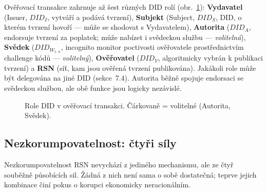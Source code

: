 \documentclass[11pt,a4paper,twocolumn]{article}
\begin{document}
Ověřovací transakce zahrnuje až šest různých DID rolí (obr.~\ref{fig:roles}): \textbf{Vydavatel} (Issuer, $DID_I$, vytváří a podává tvrzení), \textbf{Subjekt} (Subject, $DID_S$, DID, o kterém tvrzení hovoří --- může se shodovat s Vydavatelem), \textbf{Autorita} ($DID_A$, endorsuje tvrzení za poplatek; může nabízet i svědeckou službu --- \emph{volitelná}), \textbf{Svědek} ($DID_{W_{1..n}}$, incognito monitor poctivosti ověřovatele prostřednictvím challenge kódů --- \emph{volitelný}), \textbf{Ověřovatel} ($DID_V$, algoritmicky vybrán k publikaci tvrzení) a \textbf{RSN} (síť, kam jsou ověřená tvrzení publikována). Jakákoli role může být delegována na jiné DID (sekce~7.4). Autorita běžně spojuje endorsaci se svědeckou službou, ale obě funkce jsou logicky nezávislé.

\begin{figure}[ht]
\centering
{}
\caption{Role DID v ověřovací transakci. Čárkovaně = volitelné (Autorita, Svědek).}
\label{fig:roles}
\end{figure}

\subsection{Nezkorumpovatelnost: čtyři síly}

Nezkorumpovatelnost RSN nevychází z jediného mechanismu, ale ze čtyř souběžně působících sil. Žádná z nich není sama o sobě dostatečná; teprve jejich kombinace činí pokus o korupci ekonomicky neracionálním.
\end{document}
